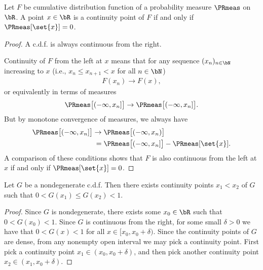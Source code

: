 \begin{lemma}
  \label{lem:cdf-continuity-pt-iff-measure-singleton}
  \leanok
  Let $F$ be cumulative distribution function of a
  probability measure $\PRmeas$ on $\bR$. A point $x \in \bR$ is
  a continuity point of $F$ if and only if $\PRmeas[\set{x}] = 0$.
\end{lemma}
\begin{proof}
  A c.d.f. is always continuous from the right.

  Continuity of $F$ from the left at $x$ means that for any
  sequence $(x_n)_{n \in \bN}$ increasing to $x$
  (i.e., $x_n \le x_{n+1} < x$ for all $n \in \bN$)
  \begin{align*}
    F(x_n) \to F(x) ,
  \end{align*}
  or equivalently in terms of measures
  \begin{align*}
    \PRmeas \big[ (-\infty,x_n] \big] \to \PRmeas \big[ (-\infty,x_n] \big] .
  \end{align*}
  But by monotone convergence of measures, we always have
  \begin{align*}
    \PRmeas \big[ (-\infty,x_n] \big]
    \to \; & \PRmeas \big[ (-\infty,x_n) \big] \\
    = \; & \PRmeas \big[ (-\infty,x_n] \big] - \PRmeas[\set{x}] .
  \end{align*}
  A comparison of these conditions shows that $F$ is also continuous from the left
  at $x$ if and only if $\PRmeas[\set{x}] = 0$.
\end{proof}

\begin{lemma}
  \label{lem:exists-two-nontrivial-continuity-pts-cdf}
  \leanok
  Let $G$ be a nondegenerate c.d.f. Then there exists
  continuity points $x_1 < x_2$ of $G$ such that
  $0 < G(x_1) \le G(x_2) < 1$.
\end{lemma}
\begin{proof}
  Since $G$ is nondegenerate, there exists some $x_0 \in \bR$ such that
  $0 < G(x_0) < 1$. Since $G$ is continuous from the right, for some
  small $\delta > 0$ we have that $0 < G(x) < 1$ for
  all $x \in [x_0,x_0+\delta)$. Since the continuity points of $G$
  are dense, from any nonempty open interval we may pick a continuity point.
  First pick a continuity point $x_1 \in (x_0,x_0+\delta)$,
  and then pick another continuity point $x_2 \in (x_1,x_0+\delta)$.
\end{proof}

